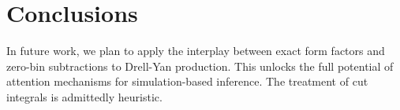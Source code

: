 \section{Conclusions}\label{sec:conclusions}

In future work, we plan to apply the interplay between exact form
factors and zero-bin subtractions to Drell-Yan production. This unlocks
the full potential of attention mechanisms for simulation-based
inference. The treatment of cut integrals is admittedly heuristic.

